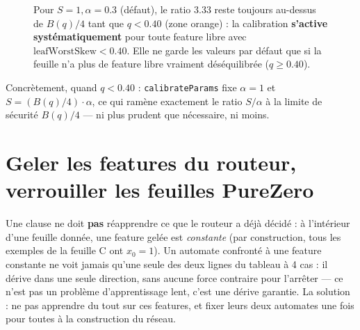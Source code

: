 \documentclass[12pt,a4paper]{article}
\newcommand{\code}[1]{\texttt{#1}}
\theoremstyle{remark}
\begin{document}
\begin{figure}[h]
\centering
{}
\caption{Pour $S{=}1,\alpha{=}0.3$ (défaut), le ratio $3.33$ reste toujours
au-dessus de $B(q)/4$ tant que $q<0.40$ (zone orange) : la calibration
\textbf{s'active systématiquement} pour toute feature libre avec
$\mathrm{leafWorstSkew}<0.40$. Elle ne garde les valeurs par défaut que si la
feuille n'a plus de feature libre vraiment déséquilibrée ($q\ge0.40$).}
\label{fig:calib-curve}
\end{figure}

\noindent Concrètement, quand $q<0.40$ : \code{calibrateParams} fixe $\alpha{=}1$
et $S = (B(q)/4)\cdot\alpha$, ce qui ramène exactement le ratio $S/\alpha$ à la
limite de sécurité $B(q)/4$ --- ni plus prudent que nécessaire, ni moins.

\section{Geler les features du routeur, verrouiller les feuilles PureZero}\label{sec:gel}

Une clause ne doit \textbf{pas} réapprendre ce que le routeur a déjà décidé : à
l'intérieur d'une feuille donnée, une feature gelée est \emph{constante} (par
construction, tous les exemples de la feuille C ont $x_0{=}1$). Un automate
confronté à une feature constante ne voit jamais qu'une seule des deux lignes du
tableau à 4 cas : il dérive dans une seule direction, sans aucune force
contraire pour l'arrêter --- ce n'est pas un problème d'apprentissage lent, c'est
une dérive garantie. La solution : ne pas apprendre du tout sur ces features,
et fixer leurs deux automates une fois pour toutes à la construction du réseau.
\end{document}
